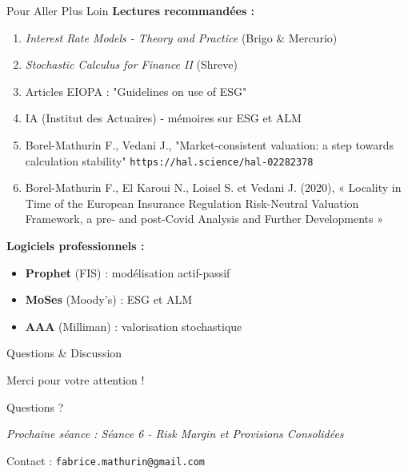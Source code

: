 \documentclass[10pt,aspectratio=169]{beamer}
\begin{document}
\begin{frame}{Pour Aller Plus Loin}
\textbf{Lectures recommandées :}

\begin{enumerate}
    \item \textit{Interest Rate Models - Theory and Practice} (Brigo \& Mercurio)
    \item \textit{Stochastic Calculus for Finance II} (Shreve)
    \item Articles EIOPA : "Guidelines on use of ESG"
    \item IA (Institut des Actuaires) - mémoires sur ESG et ALM
    \item Borel-Mathurin F., Vedani J., "Market-consistent valuation: a step towards calculation stability" \texttt{https://hal.science/hal-02282378}
    \item Borel-Mathurin F., El Karoui N., Loisel S. et Vedani J. (2020), « Locality in Time of the European
Insurance Regulation Risk-Neutral Valuation Framework, a pre- and post-Covid Analysis and Further Developments »
\end{enumerate}

\vspace{0.3cm}
\textbf{Logiciels professionnels :}
\begin{itemize}
    \item \textbf{Prophet} (FIS) : modélisation actif-passif
    \item \textbf{MoSes} (Moody's) : ESG et ALM
    \item \textbf{AAA} (Milliman) : valorisation stochastique
\end{itemize}

\end{frame}

\begin{frame}{Questions \& Discussion}
\begin{center}
\Huge Merci pour votre attention !
\vspace{1cm}

\Large Questions ?

\vspace{1cm}

\normalsize
\textit{Prochaine séance : Séance 6 - Risk Margin et Provisions Consolidées}

\vspace{0.5cm}

Contact : \texttt{fabrice.mathurin@gmail.com}
\end{center}
\end{frame}
\end{document}

